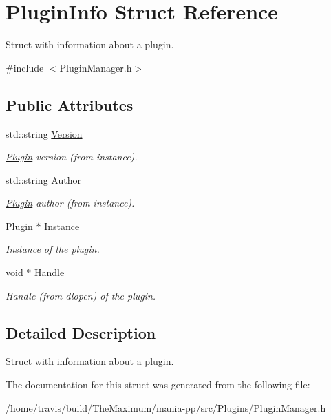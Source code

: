 \hypertarget{structPluginInfo}{\section{Plugin\-Info Struct Reference}
\label{structPluginInfo}
}


Struct with information about a plugin.  




{\ttfamily \#include $<$Plugin\-Manager.\-h$>$}

\subsection*{Public Attributes}
\begin{DoxyCompactItemize}
\item 
\hypertarget{structPluginInfo_a0bb7d324b76fa63166f7c53492971e86}{std\-::string \hyperlink{structPluginInfo_a0bb7d324b76fa63166f7c53492971e86}{Version}}\label{structPluginInfo_a0bb7d324b76fa63166f7c53492971e86}

\begin{DoxyCompactList}\small\item\em \hyperlink{classPlugin}{Plugin} version (from instance). \end{DoxyCompactList}\item 
\hypertarget{structPluginInfo_aae2dacfe0d928e4bf17b44c7356cfd93}{std\-::string \hyperlink{structPluginInfo_aae2dacfe0d928e4bf17b44c7356cfd93}{Author}}\label{structPluginInfo_aae2dacfe0d928e4bf17b44c7356cfd93}

\begin{DoxyCompactList}\small\item\em \hyperlink{classPlugin}{Plugin} author (from instance). \end{DoxyCompactList}\item 
\hypertarget{structPluginInfo_aef49f59681176d6135492b7541ff1138}{\hyperlink{classPlugin}{Plugin} $\ast$ \hyperlink{structPluginInfo_aef49f59681176d6135492b7541ff1138}{Instance}}\label{structPluginInfo_aef49f59681176d6135492b7541ff1138}

\begin{DoxyCompactList}\small\item\em Instance of the plugin. \end{DoxyCompactList}\item 
\hypertarget{structPluginInfo_a3fc5df25e8b7e3b63bd0e92f270364f2}{void $\ast$ \hyperlink{structPluginInfo_a3fc5df25e8b7e3b63bd0e92f270364f2}{Handle}}\label{structPluginInfo_a3fc5df25e8b7e3b63bd0e92f270364f2}

\begin{DoxyCompactList}\small\item\em Handle (from dlopen) of the plugin. \end{DoxyCompactList}\end{DoxyCompactItemize}


\subsection{Detailed Description}
Struct with information about a plugin. 

The documentation for this struct was generated from the following file\-:\begin{DoxyCompactItemize}
\item 
/home/travis/build/\-The\-Maximum/mania-\/pp/src/\-Plugins/Plugin\-Manager.\-h\end{DoxyCompactItemize}
